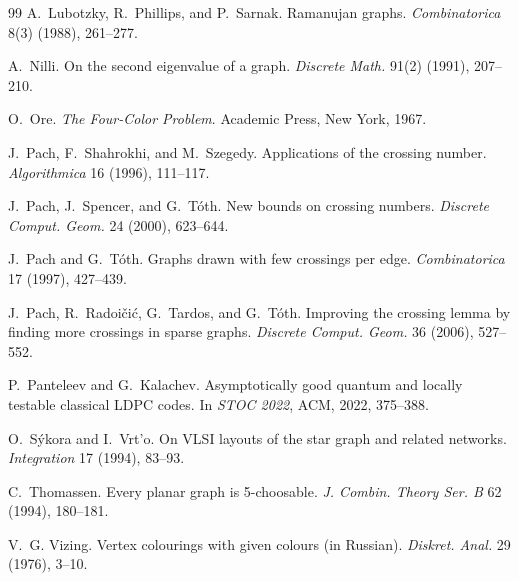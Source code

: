 \documentclass[11pt,a4paper]{article}
\theoremstyle{definition}
\begin{document}
\begin{thebibliography}{99}
A.~Lubotzky, R.~Phillips, and P.~Sarnak.
\newblock Ramanujan graphs.
\newblock \emph{Combinatorica} 8(3) (1988), 261--277.

A.~Nilli.
\newblock On the second eigenvalue of a graph.
\newblock \emph{Discrete Math.} 91(2) (1991), 207--210.

O.~Ore.
\newblock \emph{The Four-Color Problem}.
\newblock Academic Press, New York, 1967.

J.~Pach, F.~Shahrokhi, and M.~Szegedy.
\newblock Applications of the crossing number.
\newblock \emph{Algorithmica} 16 (1996), 111--117.

J.~Pach, J.~Spencer, and G.~T\'oth.
\newblock New bounds on crossing numbers.
\newblock \emph{Discrete Comput. Geom.} 24 (2000), 623--644.

J.~Pach and G.~T\'oth.
\newblock Graphs drawn with few crossings per edge.
\newblock \emph{Combinatorica} 17 (1997), 427--439.

J.~Pach, R.~Radoi\v{c}i\'c, G.~Tardos, and G.~T\'oth.
\newblock Improving the crossing lemma by finding more crossings in
sparse graphs.
\newblock \emph{Discrete Comput. Geom.} 36 (2006), 527--552.

P.~Panteleev and G.~Kalachev.
\newblock Asymptotically good quantum and locally testable classical LDPC codes.
\newblock In \emph{STOC 2022}, ACM, 2022, 375--388.

O.~S\'ykora and I.~Vrt'o.
\newblock On VLSI layouts of the star graph and related networks.
\newblock \emph{Integration} 17 (1994), 83--93.

C.~Thomassen.
\newblock Every planar graph is 5-choosable.
\newblock \emph{J. Combin. Theory Ser. B} 62 (1994), 180--181.

V.~G. Vizing.
\newblock Vertex colourings with given colours (in Russian).
\newblock \emph{Diskret. Anal.} 29 (1976), 3--10.

\end{thebibliography}
\end{document}
